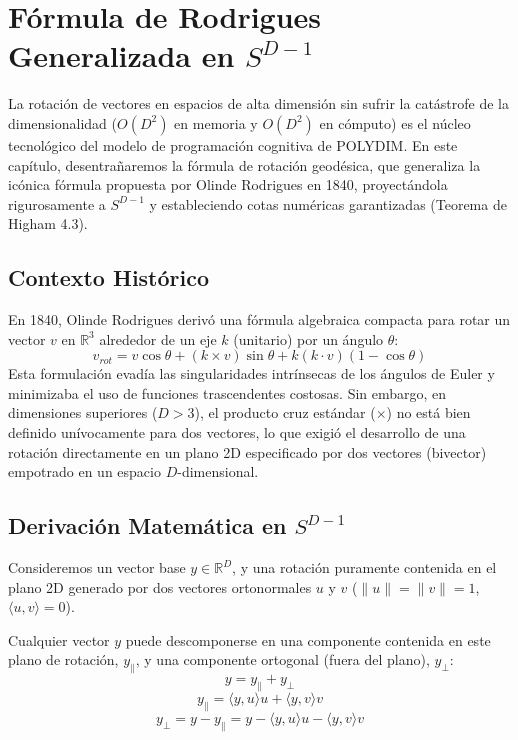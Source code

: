 \chapter{Fórmula de Rodrigues Generalizada en $S^{D-1}$}
\label{chap:rodrigues_s_d_minus_1}

La rotación de vectores en espacios de alta dimensión sin sufrir la catástrofe de la dimensionalidad ($O(D^2)$ en memoria y $O(D^2)$ en cómputo) es el núcleo tecnológico del modelo de programación cognitiva de POLYDIM. En este capítulo, desentrañaremos la fórmula de rotación geodésica, que generaliza la icónica fórmula propuesta por Olinde Rodrigues en 1840, proyectándola rigurosamente a $S^{D-1}$ y estableciendo cotas numéricas garantizadas (Teorema de Higham 4.3).

\section{Contexto Histórico}
En 1840, Olinde Rodrigues derivó una fórmula algebraica compacta para rotar un vector $v$ en $\mathbb{R}^3$ alrededor de un eje $k$ (unitario) por un ángulo $\theta$:
\begin{equation}
    v_{rot} = v \cos\theta + (k \times v) \sin\theta + k(k \cdot v)(1 - \cos\theta)
\end{equation}
Esta formulación evadía las singularidades intrínsecas de los ángulos de Euler y minimizaba el uso de funciones trascendentes costosas. Sin embargo, en dimensiones superiores ($D > 3$), el producto cruz estándar ($\times$) no está bien definido unívocamente para dos vectores, lo que exigió el desarrollo de una rotación directamente en un plano 2D especificado por dos vectores (bivector) empotrado en un espacio $D$-dimensional.

\section{Derivación Matemática en $S^{D-1}$}
Consideremos un vector base $y \in \mathbb{R}^D$, y una rotación puramente contenida en el plano 2D generado por dos vectores ortonormales $u$ y $v$ ($\|u\|=\|v\|=1$, $\langle u, v \rangle = 0$).

Cualquier vector $y$ puede descomponerse en una componente contenida en este plano de rotación, $y_\parallel$, y una componente ortogonal (fuera del plano), $y_\perp$:
\begin{equation}
    y = y_\parallel + y_\perp
\end{equation}
\begin{equation}
    y_\parallel = \langle y, u \rangle u + \langle y, v \rangle v
\end{equation}
\begin{equation}
    y_\perp = y - y_\parallel = y - \langle y, u \rangle u - \langle y, v \rangle v
\end{equation}

